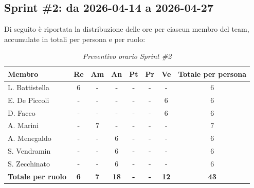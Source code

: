 \documentclass[a4paper, 10pt, colorlinks=true, linkcolor=black, urlcolor=blue, citecolor=blue, hidelinks]{article}
\renewcommand{\arraystretch}{1.2}
\begin{document}
\subsection{Sprint \#2: da 2026-04-14 a 2026-04-27}
Di seguito è riportata la distribuzione delle ore per ciascun membro del team,
accumulate in totali per persona e per ruolo:
\begin{table}[H]
    \centering
    \renewcommand{\arraystretch}{1.4}
    \begin{tabular}{|l|c|c|c|c|c|c|c|}
        \hline
        \rowcolor{bluBitless!15}
        \textbf{Membro} & \textbf{Re} & \textbf{Am} & \textbf{An} & \textbf{Pt} & \textbf{Pr} & \textbf{Ve} & \textbf{Totale per persona} \\
        \hline
        L. Battistella & 6 & - & - & - & - & - & 6 \\ \hline
        E. De Piccoli & - & - & - & - & - & 6 & 6 \\ \hline
        D. Facco & - & - & - & - & - & 6 & 6 \\ \hline
        A. Marini & - & 7 & - & - & - & - & 7 \\ \hline
        A. Menegaldo & - & - & 6 & - & - & - & 6 \\ \hline
        S. Vendramin & - & - & 6 & - & - & - & 6 \\ \hline
        S. Zecchinato & - & - & 6 & - & - & - & 6 \\ \hline
        \rowcolor{bluBitless!8}
        \textbf{Totale per ruolo} & \textbf{6} & \textbf{7} & \textbf{18} & \textbf{-} & \textbf{-} & \textbf{12} & \textbf{43} \\
        \hline
    \end{tabular}
    \caption{\textit{Preventivo orario Sprint \#2}}
\end{table}
\end{document}
